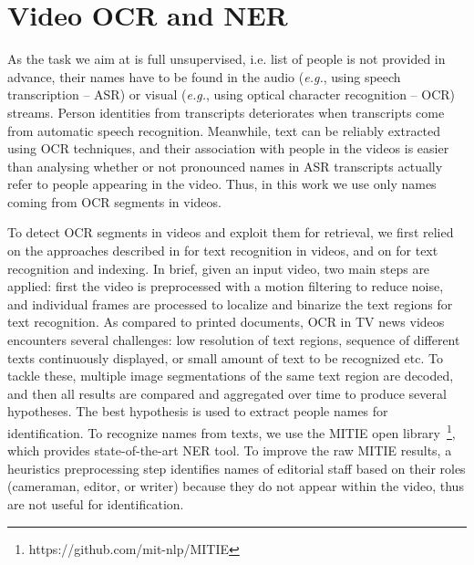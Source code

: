 \section{Video OCR and NER}
\label{sec:ocr_ner}
As the task we aim at is full unsupervised, i.e. list of people is not provided in advance, their names have to be found in the audio (\emph{e.g.}, using speech transcription -- ASR) or visual (\emph{e.g.}, using optical character recognition -- OCR) streams.
%
%
Person identities from transcripts deteriorates when transcripts come from automatic speech recognition. Meanwhile, text can be reliably extracted using OCR techniques, and their association with people in the videos is easier than analysing whether or not pronounced names in ASR transcripts actually refer to people appearing in the video. Thus, in this work we use only names coming from OCR segments in videos.

To detect OCR segments in videos and exploit them for retrieval, we first relied on the approaches described in \cite{chen-pr04,odobez-prl05} for text recognition in videos, and on \cite{daddaoua:ICDAR:05,vincia:tmm:05} for text recognition and indexing.
%
In brief, given an input video, two main steps are applied: first the video is preprocessed with a motion filtering to reduce noise, and individual frames are processed to localize and binarize the text regions for text recognition.
%
As compared to printed documents, OCR in TV news videos encounters several challenges: low resolution of text regions, sequence of different texts continuously displayed, or small amount of text to be recognized etc.
%
To tackle these, multiple image segmentations of the same text region are decoded, and then all results are compared and aggregated over time to produce several hypotheses. 
%
The best hypothesis is used to extract people names for identification. To recognize names from texts, we use the MITIE open library~\footnote{https://github.com/mit-nlp/MITIE}, which provides state-of-the-art NER tool. 
%
%
To improve the raw MITIE results, a heuristics preprocessing step identifies names of editorial staff based on their roles (cameraman, editor, or writer) because they do not appear within the video, thus are not useful for identification.

\endinput
